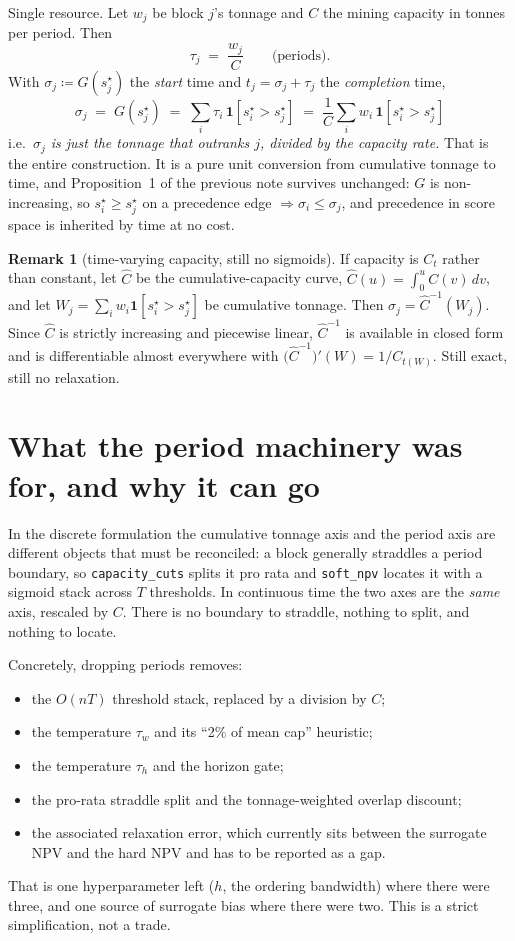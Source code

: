 \documentclass[11pt,a4paper]{article}
\newcommand{\ind}[1]{\mathbf{1}\!\left[#1\right]}
\newcommand{\sstar}{s^{\star}}
\theoremstyle{definition}
\newtheorem{remark}{Remark}
\begin{document}
Single resource. Let $w_j$ be block $j$'s tonnage and $C$ the mining capacity in tonnes per
period. Then
\[
  \tau_j \;=\; \frac{w_j}{C} \qquad\text{(periods)} .
\]
With $\sigma_j \coloneqq G(\sstar_j)$ the \emph{start} time and $t_j = \sigma_j + \tau_j$ the
\emph{completion} time,
\[
  \boxed{\;
  \sigma_j \;=\; G\!\left(\sstar_j\right)
  \;=\; \sum_{i} \tau_i \, \ind{\sstar_i > \sstar_j}
  \;=\; \frac{1}{C}\sum_i w_i\, \ind{\sstar_i > \sstar_j}
  \;}
\]
i.e.\ \emph{$\sigma_j$ is just the tonnage that outranks $j$, divided by the capacity rate.} That
is the entire construction. It is a pure unit conversion from cumulative tonnage to time, and
Proposition~1 of the previous note survives unchanged: $G$ is non-increasing, so
$\sstar_i \ge \sstar_j$ on a precedence edge $\Rightarrow \sigma_i \le \sigma_j$, and precedence
in score space is inherited by time at no cost.

\begin{remark}[time-varying capacity, still no sigmoids]
If capacity is $C_t$ rather than constant, let $\widehat{C}$ be the cumulative-capacity curve,
$\widehat{C}(u) = \int_0^u C(v)\,dv$, and let $W_j = \sum_i w_i \ind{\sstar_i > \sstar_j}$ be
cumulative tonnage. Then $\sigma_j = \widehat{C}^{-1}(W_j)$. Since $\widehat{C}$ is strictly
increasing and piecewise linear, $\widehat{C}^{-1}$ is available in closed form and is
differentiable almost everywhere with $\big(\widehat{C}^{-1}\big)'(W) = 1/C_{t(W)}$. Still exact,
still no relaxation.
\end{remark}

\section{What the period machinery was for, and why it can go}

In the discrete formulation the cumulative tonnage axis and the period axis are different objects
that must be reconciled: a block generally straddles a period boundary, so
\texttt{capacity\_cuts} splits it pro rata and \texttt{soft\_npv} locates it with a sigmoid stack
across $T$ thresholds. In continuous time the two axes are the \emph{same} axis, rescaled by $C$.
There is no boundary to straddle, nothing to split, and nothing to locate.

Concretely, dropping periods removes:
\begin{itemize}[leftmargin=1.4em,itemsep=1pt,topsep=2pt]
  \item the $O(nT)$ threshold stack, replaced by a division by $C$;
  \item the temperature $\tau_w$ and its ``2\% of mean cap'' heuristic;
  \item the temperature $\tau_h$ and the horizon gate;
  \item the pro-rata straddle split and the tonnage-weighted overlap discount;
  \item the associated relaxation error, which currently sits between the surrogate NPV and the
        hard NPV and has to be reported as a gap.
\end{itemize}
That is one hyperparameter left ($h$, the ordering bandwidth) where there were three, and one
source of surrogate bias where there were two. This is a strict simplification, not a trade.
\end{document}
